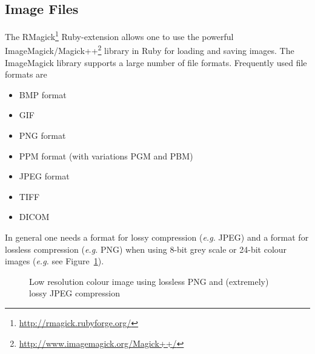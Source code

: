 \documentclass[12pt,a4paper,oneside,openright]{book}
\newcommand{\eg}{\emph{e.g.} }
\newcommand{\fig}[1]{Figure~\ref{fig:#1}}
\begin{document}
\begin{CJK}{UTF8}{}
\section{Image Files}\label{cha:rmagick}
The RMagick\footnote{\url{http://rmagick.rubyforge.org/}} Ruby-extension allows one to use the powerful ImageMagick/Magick++\footnote{\url{http://www.imagemagick.org/Magick++/}} library in Ruby for loading and saving images. The ImageMagick library supports a large number of file formats. Frequently used file formats are
\begin{itemize}
\item \acf{BMP} format
\item \acf{GIF}
\item \acf{PNG} format
\item \acf{PPM} format (with variations \acf{PGM} and \acf{PBM})
\item \acf{JPEG} format
\item \acf{TIFF}
\item \acf{DICOM}
\end{itemize}
In general one needs a format for lossy compression (\eg \ac{JPEG}) and a format for lossless compression (\eg \ac{PNG}) when using 8-bit grey scale or 24-bit colour images (\eg see \fig{lossy}).
\begin{figure}[htbp]
   \begin{center}
     \begin{minipage}[c]{.495\textwidth}
     \end{minipage}
     \begin{minipage}[c]{.495\textwidth}
     \end{minipage}
     \caption{Low resolution colour image using lossless \acs{PNG} and (extremely) lossy \acs{JPEG} compression\label{fig:lossy}}
   \end{center}
\end{figure}

\end{CJK}
\end{document}
